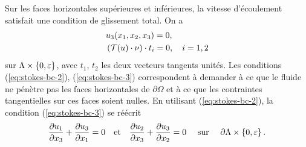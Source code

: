 Sur les faces horizontales supérieures et inférieures, la vitesse
d'écoulement satisfait une condition de glissement total. On a
\begin{align}
  &u_3(x_1, x_2, x_3) = 0,\label{eq:stokes-bc-2}\\
  &\left( \mathcal T(u)\cdot \nu \right)\cdot t_i = 0,\quad i = 1,2\label{eq:stokes-bc-3}
\end{align}
sur $\Lambda \times\left\{ 0,\varepsilon \right\}$, avec $t_1$, $t_2$ les deux
vecteurs tangents unités.
Les conditions (\ref{eq:stokes-bc-2}), (\ref{eq:stokes-bc-3})
correspondent à demander à ce que le fluide ne pénètre pas les faces
horizontales de $\partial\Omega$ et à ce que les contraintes
tangentielles sur ces faces soient nulles. En utilisant
(\ref{eq:stokes-bc-2}), la condition (\ref{eq:stokes-bc-3}) se réécrit
\begin{equation}
\frac{\partial u_1}{\partial x_3} + \frac{\partial u_3}{\partial x_1}
  = 0 \quad \text{et} \quad \frac{\partial u_2}{\partial x_3} + \frac{\partial u_3}{\partial x_2}
  = 0\quad \text{ sur }\quad\partial \Lambda \times\left\{ 0,\varepsilon \right\}.
\end{equation}

